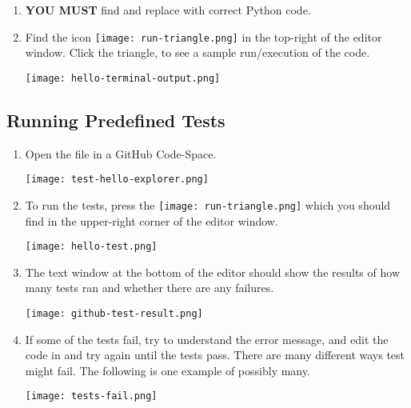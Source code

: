 \begin{enumerate}
\item  \textbf{YOU MUST} find and replace  with correct Python code.

\item Find the icon \texttt{[image: run-triangle.png]} in the
top-right of the editor window.  Click the triangle, to see a sample
run/execution of the code.

\noindent\texttt{[image: hello-terminal-output.png]}

\end{enumerate}

\subsection{Running Predefined Tests}
\label{sec.run.tests}
\begin{enumerate}


\item Open the file  in a GitHub Code-Space.

\noindent\texttt{[image: test-hello-explorer.png]}

\item To run the tests, press the
\texttt{[image: run-triangle.png]} which you should find in
the upper-right corner of the editor window.

\noindent\texttt{[image: hello-test.png]}


\item The text window at the bottom of the editor should show the results of
how many tests ran and whether there are any failures.

\noindent\texttt{[image: github-test-result.png]}

\item If some of the tests fail, try to understand the error message, and edit
  the code in  and try again until the tests pass.  There are many
  different ways test might fail.  The following is one example of possibly many.

\noindent\texttt{[image: tests-fail.png]}


\end{enumerate}

\clearpage

